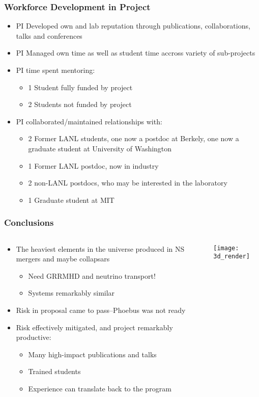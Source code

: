 \documentclass[]{beamer}
\newcommand{\backupbegin}{
   \newcounter{finalframe}
   \setcounter{finalframe}{\value{framenumber}}
}
\newcommand{\backupend}{
   \setcounter{framenumber}{\value{finalframe}}
}
\begin{document}
\begin{frame}
  \frametitle{Workforce Development in Project}
  \begin{itemize}
  \item PI Developed own and lab reputation through publications,
    collaborations, talks and conferences
  \item PI Managed own time as well as student time accross variety of
    sub-projects
  \item PI time spent mentoring:
    \begin{itemize}
    \item 1 Student fully funded by project
    \item 2 Students not funded by project
    \end{itemize}
  \item PI collaborated/maintained relationships with:
    \begin{itemize}
    \item 2 Former LANL students, one now a postdoc at Berkely, one
      now a graduate student at University of Washington
    \item 1 Former LANL postdoc, now in industry
    \item 2 non-LANL postdocs, who may be interested in the laboratory
    \item 1 Graduate student at MIT
    \end{itemize}
  \end{itemize}
\end{frame}

\begin{frame}
  \frametitle{Conclusions}
  \begin{columns}
    \begin{column}{7cm}
      \begin{itemize}
      \item The heaviest elements in the universe produced in NS mergers and maybe collapsars
        \begin{itemize}
        \item Need GRRMHD and neutrino transport!
        \item Systems remarkably similar
        \end{itemize}
      \item Risk in proposal came to pass--Phoebus was not ready
      \item Risk effectively mitigated, and project remarkably productive:
        \begin{itemize}
        \item Many high-impact publications and talks
        \item Trained students
        \item Experience can translate back to the program
        \end{itemize}
      \end{itemize}
    \end{column}
    \begin{column}{5cm}
      \texttt{[image: 3d\_render]}
    \end{column}
  \end{columns}
\end{frame}

\backupbegin

\backupend
\end{document}
